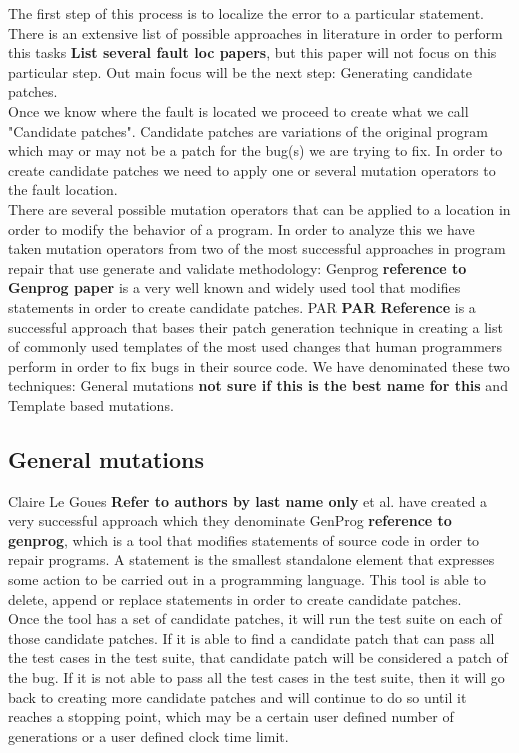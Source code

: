 \documentclass[conference]{IEEEtran}
\newcommand{\todo}[1]
  {{\scriptsize \textbf{\color{red} {#1}}}}
\begin{document}
{{The first step of this process is to localize the error to a particular statement. There is an extensive list of possible approaches in literature in order to perform this tasks \todo{List several fault loc papers}, but this paper will not focus on this particular step. Out main focus will be the next step: Generating candidate patches.\\
Once we know where the fault is located we proceed to create what we call "Candidate patches". Candidate patches are variations of the original program which may or may not be a patch for the bug(s) we are trying to fix. In order to create candidate patches we need to apply one or several mutation operators to the fault location. \\
There are several possible mutation operators that can be applied to a location in order to modify the behavior of a program. In order to analyze this we have taken mutation operators from two of the most successful approaches in program repair that use generate and validate methodology: Genprog \todo{reference to Genprog paper} is a very well known and widely used tool that modifies statements in order to create candidate patches.   PAR \todo{PAR Reference} is a successful approach that bases their patch generation technique in creating a list of commonly used templates of the most used changes that human programmers perform in order to fix bugs in their source code. We have denominated these two techniques: General mutations \todo{not sure if this is the best name for this} and Template based mutations.


\subsection{General mutations}
Claire Le Goues\todo{Refer to authors by last name only} et al. have created a very successful approach which they denominate GenProg \todo{reference to genprog}, which is a tool that modifies statements of source code in order to repair programs. A statement is the smallest standalone element that expresses some action to be carried out in a programming language. This tool is able to delete, append or replace statements in order to create candidate patches.\\
Once the tool has a set of candidate patches, it will run the test suite on each of those candidate patches. If it is able to find a candidate patch that can pass all the test cases in the test suite, that candidate patch will be considered a patch of the bug. If it is not able to pass all the test cases in the test suite, then it will go back to creating more candidate patches and will continue to do so until it reaches a stopping point, which may be a certain user defined number of generations or a user defined clock time limit.


}}
\end{document}
